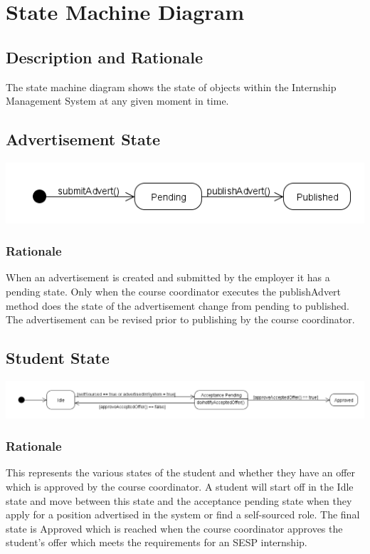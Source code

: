 \documentclass{l3deliverable}
\begin{document}
\section{State Machine Diagram}
\subsection{Description and Rationale}
The state machine diagram shows the state of objects within the Internship Management System at any given moment in time.\\

\subsection{Advertisement State}
\includegraphics[scale = 0.5]{AdvertState.png}\\

\subsubsection{Rationale}
When an advertisement is created and submitted by the employer it has a pending state.
Only when the course coordinator executes the publishAdvert method does the state of the 
advertisement change from pending to published. The advertisement can be revised prior to
publishing by the course coordinator. \\

\subsection{Student State}
\includegraphics[scale = 0.45]{StudentState.png}\\

\subsubsection{Rationale}
This represents the various states of the student and whether they have an offer which is approved by the course coordinator.
A student will start off in the Idle state and move between this state and the acceptance pending state when they apply for a position advertised in the system
or find a self-sourced role. The final state is Approved which is reached when the course coordinator approves the student's offer which meets the requirements for an
SESP internship. \\  
\end{document}
